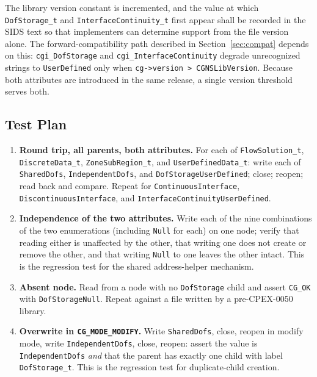 \documentclass[11pt,letterpaper]{article}
\begin{document}
The library version constant is incremented, and the value at which
\texttt{DofStorage\_t} and \texttt{InterfaceContinuity\_t} first appear
shall be recorded in the SIDS text
so that implementers can determine support from the file version
alone.  The forward-compatibility path described in
Section~\ref{sec:compat} depends on this: \texttt{cgi\_DofStorage} and
\texttt{cgi\_InterfaceContinuity} degrade unrecognized strings to
\texttt{UserDefined} only when \texttt{cg->version > CGNSLibVersion}.
Because both attributes are introduced in the same release, a single
version threshold serves both.

\subsection{Test Plan}

\begin{enumerate}[leftmargin=2em]
\item \textbf{Round trip, all parents, both attributes.}  For each of
  \texttt{FlowSolution\_t}, \texttt{DiscreteData\_t},
  \texttt{ZoneSubRegion\_t}, and \texttt{UserDefinedData\_t}: write
  each of \texttt{SharedDofs}, \texttt{IndependentDofs}, and
  \texttt{DofStorageUserDefined}; close; reopen; read back and compare.
  Repeat for \texttt{ContinuousInterface},
  \texttt{DiscontinuousInterface}, and
  \texttt{InterfaceContinuityUserDefined}.

\item \textbf{Independence of the two attributes.}  Write each of the
  nine combinations of the two enumerations (including
  \texttt{Null} for each) on one node; verify that reading either is
  unaffected by the other, that writing one does not create or remove
  the other, and that writing \texttt{Null} to one leaves the other
  intact.  This is the regression test for the shared address-helper
  mechanism.

\item \textbf{Absent node.}  Read from a node with no
  \texttt{DofStorage} child and assert \texttt{CG\_OK} with
  \texttt{DofStorageNull}.  Repeat against a file written by a
  pre-CPEX-0050 library.

\item \textbf{Overwrite in \texttt{CG\_MODE\_MODIFY}.}  Write
  \texttt{SharedDofs}, close, reopen in modify mode, write
  \texttt{IndependentDofs}, close, reopen: assert the value is
  \texttt{IndependentDofs} \emph{and} that the parent has exactly one
  child with label \texttt{DofStorage\_t}.  This is the regression
  test for duplicate-child creation.


\end{enumerate}
\end{document}
